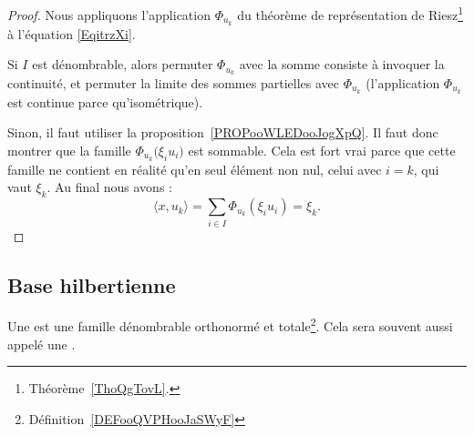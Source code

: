 \begin{proof}
	Nous appliquons l'application \( \Phi_{u_k}\) du théorème de représentation de Riesz\footnote{Théorème~\ref{ThoQgTovL}.} à l'équation \eqref{EqitrzXi}.

	Si \( I\) est dénombrable, alors permuter \( \Phi_{u_k}\) avec la somme consiste à invoquer la continuité, et permuter la limite des sommes partielles avec \( \Phi_{u_k}\) (l'application \( \Phi_{u_k}\) est continue parce qu'isométrique).

	Sinon, il faut utiliser la proposition~\ref{PROPooWLEDooJogXpQ}. Il faut donc montrer que la famille \( \Phi_{u_k}\big( \xi_iu_i \big)\) est sommable. Cela est fort vrai parce que cette famille ne contient en réalité qu'en seul élément non nul, celui avec \( i=k\), qui vaut \( \xi_k\). Au final nous avons :
	\begin{equation}
		\langle x, u_k\rangle =\sum_{i\in I}\Phi_{u_k}(\xi_iu_i)=\xi_k.
	\end{equation}
\end{proof}

\subsection{Base hilbertienne}

\begin{definition}      \label{DEFooADQXooFoIhTG}
	Une  est une famille dénombrable orthonormé et totale\footnote{Définition~\ref{DEFooQVPHooJaSWyF}}. Cela sera souvent aussi appelé une .
\end{definition}

